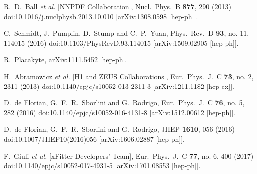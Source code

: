 \documentclass[review]{elsarticle}
\begin{document}
\begin{thebibliography}{}
  R.~D.~Ball {\it et al.} [NNPDF Collaboration],
  Nucl.\ Phys.\ B {\bf 877}, 290 (2013)
  doi:10.1016/j.nuclphysb.2013.10.010
  [arXiv:1308.0598 [hep-ph]].
  
  C.~Schmidt, J.~Pumplin, D.~Stump and C.~P.~Yuan,
  Phys.\ Rev.\ D {\bf 93}, no. 11, 114015 (2016)
  doi:10.1103/PhysRevD.93.114015
  [arXiv:1509.02905 [hep-ph]].

  R.~Placakyte,
  arXiv:1111.5452 [hep-ph].
  
  H.~Abramowicz {\it et al.} [H1 and ZEUS Collaborations],
  Eur.\ Phys.\ J.\ C {\bf 73}, no. 2, 2311 (2013)
  doi:10.1140/epjc/s10052-013-2311-3
  [arXiv:1211.1182 [hep-ex]].

  D.~de Florian, G.~F.~R.~Sborlini and G.~Rodrigo,
  Eur.\ Phys.\ J.\ C {\bf 76}, no. 5, 282 (2016)
  doi:10.1140/epjc/s10052-016-4131-8
  [arXiv:1512.00612 [hep-ph]].

  D.~de Florian, G.~F.~R.~Sborlini and G.~Rodrigo,
  JHEP {\bf 1610}, 056 (2016)
  doi:10.1007/JHEP10(2016)056
  [arXiv:1606.02887 [hep-ph]].
  
  
    F.~Giuli {\it et al.} [xFitter Developers' Team],
    Eur.\ Phys.\ J.\ C {\bf 77}, no. 6, 400 (2017)
    doi:10.1140/epjc/s10052-017-4931-5
    [arXiv:1701.08553 [hep-ph]].
    

\end{thebibliography}
\end{document}
